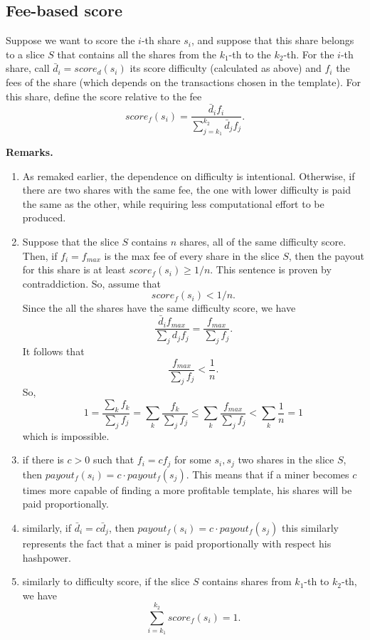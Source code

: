 \documentclass[11pt]{article} %
\begin{document}
\subsection{Fee-based score}
\begin{comment} We recall that a slice is denoted with $S_{a,\ell}$ with $\ell$ is the prevhash and $0 \le a \le n_\ell$, with $n_\ell$ is the number of slices for the group $B_\ell$ of all the shares that have the same prevhash $\ell$. We recall also that to each slice $S_{a,\ell}$ is assigned a portion of the block fees $F_{S_{a, \ell}}$.\newline
Now it is given a method for scoring the shares within a slice and redistributing $F_{S_{a, \ell}}$ accorindgly. Since we are working within a single slice, there is no need to keep track of the indexes. So, in order to keep the notation light, with abuse of notation we simply denote $S_{a, \ell}$ with and $F_{S_{a, \ell}}$ with $F_S$.
\end{comment}
Suppose we want to score the $i$-th share $s_i$, and suppose that this share belongs to a slice $S$ that contains all the shares from the $k_1$-th to the $k_2$-th.
For the $i$-th share, call $\bar d_i = score_d(s_i)$ its score difficulty (calculated as above) and $f_i$ the fees of the share (which depends on the transactions chosen in the template). For this share, define the score relative to the fee
\[
score_f(s_i) = \frac{\bar d_if_i}{\sum_{j=k_1}^{k_2}\bar d_j f_j}.
\]

\textbf{Remarks.} \begin{enumerate} 
\item As remaked earlier, the dependence on difficulty is intentional. Otherwise, if there are two shares with the same fee, the one with lower difficulty is paid the same as the other, while requiring less computational effort to be produced.
\item Suppose that the slice $S$ contains $n$ shares, all of the same difficulty score. Then, if $f_i = f_{max}$ is the max fee of every share in the slice $S$, then the payout for this share is at least $score_f(s_i) \ge 1/n$. This sentence is proven by contraddiction. So, assume that 
\[score_f(s_i) < 1/n.\]
Since the all the shares have the same difficulty score, we have 
\[\frac{\bar d_if_{max}}{\sum_j d_j f_j} = \frac{f_{max}}{\sum_j f_j}.\]It follows that
\[ \frac{f_{max}}{\sum_j f_j} <\frac{1} {n}.\]
So,
\[ 1 = \frac{\sum_k f_k}{\sum_j f_j} = \sum_k \frac {f_k}{\sum_j f_j} \le \sum_k \frac{f_{max}}{\sum_j f_j}<\sum_k\frac{1}{n} = 1\]
which is impossible.
\item if there is $c>0$ such that $f_i = cf_j$ for some $s_i, s_j$ two shares in the slice $S$, then $payout_f(s_i) = c \cdot payout_f(s_j)$. This means that if a miner becomes $c$ times more capable of finding a more profitable template, his shares will be paid proportionally.
\item similarly, if $\bar d_i = c \bar d_j$, then $payout_f(s_i) = c \cdot payout_f(s_j)$ this similarly represents the fact that a miner is paid proportionally with respect his hashpower.
\item similarly to difficulty score, if the slice $S$ contains shares from $k_1$-th to $k_2$-th, we have \[\sum_{i=k_1}^{k_2} score_f(s_i) = 1. \]
\end{enumerate}
\end{document}
